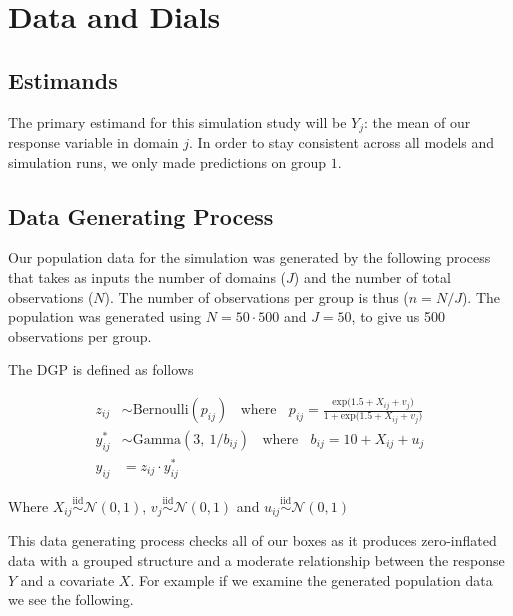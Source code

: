 \documentclass[12pt,twoside]{reedthesis}
\begin{document}
\hypertarget{data-and-dials}{%
\section{Data and Dials}\label{data-and-dials}}

\hypertarget{estimands}{%
\subsection{Estimands}\label{estimands}}

The primary estimand for this simulation study will be \(Y_j\): the mean of our response variable in domain \(j\). In order to stay consistent across all models and simulation runs, we only made predictions on group \(1\).

\hypertarget{data-generating-process}{%
\subsection{Data Generating Process}\label{data-generating-process}}

Our population data for the simulation was generated by the following process that takes as inputs the number of domains (\(J\)) and the number of total observations (\(N\)). The number of observations per group is thus (\(n = N/J\)). The population was generated using \(N = 50\cdot 500\) and \(J = 50\), to give us 500 observations per group.

The DGP is defined as follows

\[
\begin{aligned}
z_{ij} &\sim \text{Bernoulli}(p_{ij}) \ \ \ \ \text{where} \ \ \ \ p_{ij} = \frac{\text{exp}\big(1.5 + X_{ij} + v_j\big)}{1 + \text{exp}\big(1.5 + X_{ij} + v_j\big)} \\
y^*_{ij} &\sim \text{Gamma}(3, \  1/b_{ij}) \ \ \ \ \text{where} \ \ \ \ b_{ij} = 10 + X_{ij} + u_{j} \\
y_{ij} &=z_{ij}\cdot y^*_{ij}
\end{aligned}
\]

Where \(X_{ij} \overset{\text{iid}}{\sim} \mathcal{N}(0, 1)\), \(v_j \overset{\text{iid}}{\sim} \mathcal{N}(0, 1)\) and \(u_{ij} \overset{\text{iid}}{\sim} \mathcal{N}(0, 1)\)

This data generating process checks all of our boxes as it produces zero-inflated data with a grouped structure and a moderate relationship between the response \(Y\) and a covariate \(X\). For example if we examine the generated population data we see the following.
\end{document}
